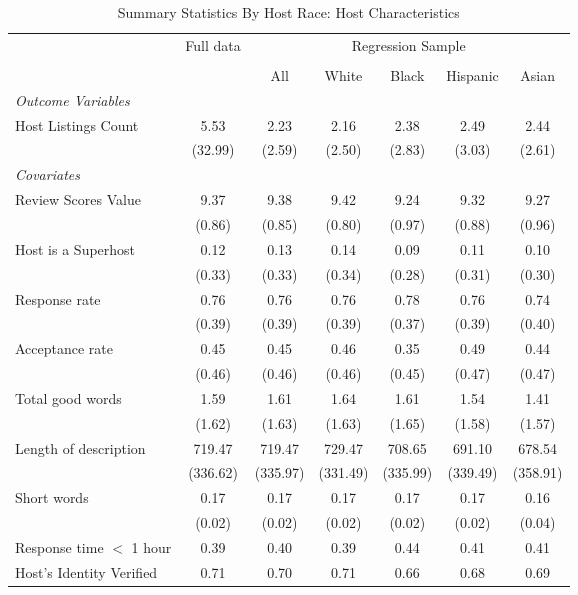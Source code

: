 \begin{table}[htbp]
\caption{Summary Statistics By Host Race: Host Characteristics}
\begin{center}%
\small\begin{tabular}{l c | c | c c c c}
& \multicolumn{1}{c}{Full data} & \multicolumn{5}{c}{Regression Sample}
\\
 \cmidrule(r){3-7}
\\
 & \multicolumn{1}{c}{} & \multicolumn{1}{c}{All} & White & Black & Hispanic & Asian
\\
\hline\hline\noalign{\smallskip} 
 \textit{\textit{Outcome Variables}} & & & & & & \\ Host Listings Count & 5.53 & 2.23 & 2.16 & 2.38 & 2.49 & 2.44 \\
 & (32.99) & (2.59) & (2.50) & (2.83) & (3.03) & (2.61) \\
 \textit{Covariates} & & & & & & \\ \hline Review Scores Value & 9.37 & 9.38 & 9.42 & 9.24 & 9.32 & 9.27 \\
 & (0.86) & (0.85) & (0.80) & (0.97) & (0.88) & (0.96) \\
 Host is a Superhost & 0.12 & 0.13 & 0.14 & 0.09 & 0.11 & 0.10 \\
 & (0.33) & (0.33) & (0.34) & (0.28) & (0.31) & (0.30) \\
 Response rate & 0.76 & 0.76 & 0.76 & 0.78 & 0.76 & 0.74 \\
 & (0.39) & (0.39) & (0.39) & (0.37) & (0.39) & (0.40) \\
 Acceptance rate & 0.45 & 0.45 & 0.46 & 0.35 & 0.49 & 0.44 \\
 & (0.46) & (0.46) & (0.46) & (0.45) & (0.47) & (0.47) \\
 Total good words & 1.59 & 1.61 & 1.64 & 1.61 & 1.54 & 1.41 \\
 & (1.62) & (1.63) & (1.63) & (1.65) & (1.58) & (1.57) \\
 Length of description & 719.47 & 719.47 & 729.47 & 708.65 & 691.10 & 678.54 \\
 & (336.62) & (335.97) & (331.49) & (335.99) & (339.49) & (358.91) \\
 Short words & 0.17 & 0.17 & 0.17 & 0.17 & 0.17 & 0.16 \\
 & (0.02) & (0.02) & (0.02) & (0.02) & (0.02) & (0.04) \\
 Response time $<$ 1 hour & 0.39 & 0.40 & 0.39 & 0.44 & 0.41 & 0.41 \\ Host's Identity Verified & 0.71 & 0.70 & 0.71 & 0.66 & 0.68 & 0.69 \\

\end{tabular}
\end{center}
\end{table}
